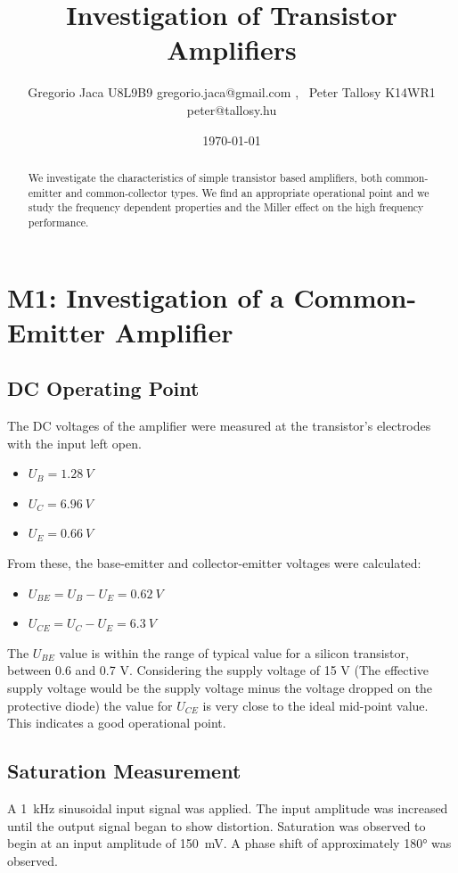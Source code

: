 \documentclass[12pt,a4paper]{article}
\title{Investigation of Transistor Amplifiers}
\author{Gregorio Jaca U8L9B9 gregorio.jaca@gmail.com , \ Peter Tallosy K14WR1 peter@tallosy.hu }
\date{\today}
\begin{document}
\maketitle

\begin{abstract}
We investigate the characteristics of simple transistor based amplifiers, both common-emitter and common-collector types. We find an appropriate operational point and we study the frequency dependent properties and the Miller effect on the high frequency performance.
\end{abstract}

\section{M1: Investigation of a Common-Emitter Amplifier}

\subsection{DC Operating Point}
The DC voltages of the amplifier were measured at the transistor's electrodes with the input left open.
\begin{itemize}
    \item $U_B = \SI{1.28}{V}$
    \item $U_C = \SI{6.96}{V}$
    \item $U_E = \SI{0.66}{V}$
\end{itemize}
From these, the base-emitter and collector-emitter voltages were calculated:
\begin{itemize}
    \item $U_{BE} = U_B - U_E = \SI{0.62}{V}$
    \item $U_{CE} = U_C - U_E = \SI{6.3}{V}$
\end{itemize}

The $U_{BE}$ value is within the range of typical value for a silicon transistor, between 0.6 and 0.7 V. Considering the supply voltage of 15 V (The effective supply voltage would be the supply voltage minus the voltage dropped on the protective diode) the value for $U_{CE}$ is very close to the ideal mid-point value. This indicates a good operational point.

\subsection{Saturation Measurement}
A \SI{1}{kHz} sinusoidal input signal was applied. The input amplitude was increased until the output signal began to show distortion. Saturation was observed to begin at an input amplitude of \SI{150}{mV}. A phase shift of approximately 180° was observed. 
\end{document}
